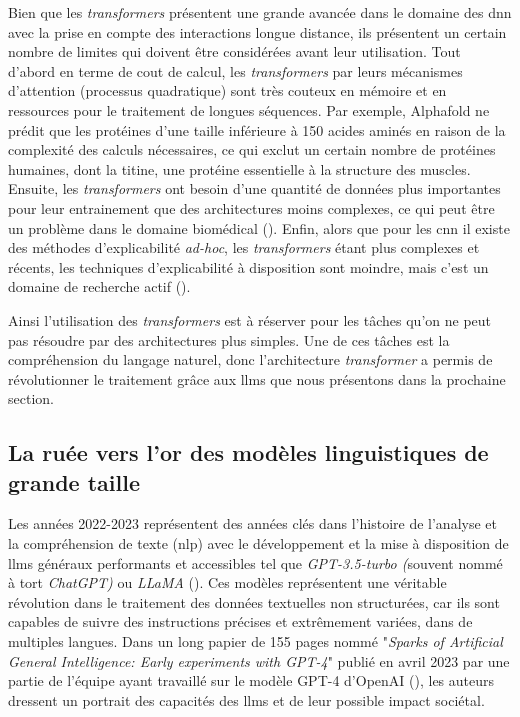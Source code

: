 Bien que les \textit{transformers} présentent une grande avancée dans le domaine des \gls{dnn} avec la prise en compte des interactions longue distance, ils présentent un certain nombre de limites qui doivent être considérées avant leur utilisation. Tout d'abord en terme de cout de calcul, les \textit{transformers} par leurs mécanismes d'attention (processus quadratique) sont très couteux en mémoire et en ressources pour le traitement de longues séquences. Par exemple, Alphafold ne prédit que les protéines d'une taille inférieure à 150 acides aminés en raison de la complexité des calculs nécessaires, ce qui exclut un certain nombre de protéines humaines, dont la titine, une protéine essentielle à la structure des muscles. Ensuite, les \textit{transformers} ont besoin d'une quantité de données plus importantes pour leur entrainement que des architectures moins complexes, ce qui peut être un problème dans le domaine biomédical (\cite{willemink_toward_2022}). Enfin, alors que pour les \gls{cnn} il existe des méthodes d'explicabilité \textit{ad-hoc}, les \textit{transformers} étant plus complexes et récents, les techniques d'explicabilité à disposition sont moindre, mais c'est un domaine de recherche actif (\cite{kim_can_2022, saha_explainability_2022}). 


Ainsi l'utilisation des \textit{transformers} est à réserver pour les tâches qu'on ne peut pas résoudre par des architectures plus simples. Une de ces tâches est la compréhension du langage naturel, donc l'architecture \textit{transformer} a permis de révolutionner le traitement grâce aux \gls{llms} que nous présentons dans la prochaine section.

\subsection{La ruée vers l'or des modèles linguistiques de grande taille}\label{chap2_llms}
Les années 2022-2023 représentent des années clés dans l’histoire de l'analyse et la compréhension de texte (\gls{nlp}) avec le développement et la mise à disposition de \gls{llms} généraux performants et accessibles tel que \textit{GPT-3.5-turbo (}souvent nommé à tort \textit{ChatGPT)} ou \textit{LLaMA} (\cite{touvron_llama_2023}).  Ces modèles représentent une véritable révolution dans le traitement des données textuelles non structurées, car ils sont capables de suivre des instructions précises et extrêmement variées, dans de multiples langues. Dans un long papier de 155 pages nommé "\textit{Sparks of Artificial General Intelligence: Early experiments with GPT-4}" publié en avril 2023 par une partie de l'équipe ayant travaillé sur le modèle GPT-4 d'OpenAI (\cite{bubeck_sparks_2023}), les auteurs dressent un portrait des capacités des \gls{llms} et de leur possible impact sociétal.


